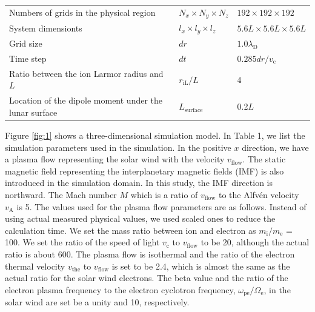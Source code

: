 \documentclass[draft,jgrga]{agutex2015}
\begin{document}
\begin{article}
\begin{table}[h]
\begin{tabular}{p{}ll}
 Numbers of grids in the physical region  &  
 $N_x \times N_y \times N_z$        &  $192 \times 192 \times 192$  \\
 System dimensionts                 &   
$l_x \times l_y \times l_z$ & $ 5.6L \times 5.6L \times 5.6L$  \\
 Grid size                          &   $dr$  & $1.0\lambda_\mathrm{D}$  \\
 Time step                          &   $dt$  &  $0.285dr/v_\mathrm{c}$  \\
 Ratio between the ion Larmor radius and $L$ &
     $ r_\mathrm{iL}/L$  & 4 \\
 Location of the dipole moment under the lunar surface  &   $L_\mathrm{surface}$ 
 &  0.2$L$ \\   \hline
 \end{tabular}
\end{table}


Figure \ref{fig:1} shows a three-dimensional simulation model.
In Table 1, we list the simulation parameters used in the simulation. 
In the positive $x$ direction, 
we have a plasma flow representing the solar wind 
with the velocity $v_\mathrm{flow}$. 
The static magnetic field representing the interplanetary magnetic fields (IMF) 
is also introduced in the simulation domain. 
In this study, the IMF direction is northward. 
The Mach number $M$ which is a ratio of $v_\mathrm{flow}$ to 
the Alfv\'{e}n velocity $v_\mathrm{A}$ is 5. 
The values used for the plasma flow parameters are as follows. 
Instead of using actual measured physical values, 
we used scaled ones to reduce the calculation time. 
We set the mass ratio between ion and electron as $ m_\mathrm{i}/ m_\mathrm{e}$ = 100. 
We set the ratio of the speed of light $v_\mathrm{c}$ to $v_\mathrm{flow}$ to be 20, 
although the actual ratio is about 600. 
The plasma flow is isothermal and 
the ratio of the electron thermal velocity 
$v_\mathrm{the}$ to $v_\mathrm{flow}$ is set to be 2.4, 
which is almost the same as the actual ratio for the solar wind electrons. 
The beta value and the ratio of the electron plasma frequency to 
the electron cyclotron frequency,
$\omega_\mathrm{pe} / \Omega_\mathrm{e}$, 
in the solar wind are set be a unity and 10, respectively. 


\end{article}
\end{document}
